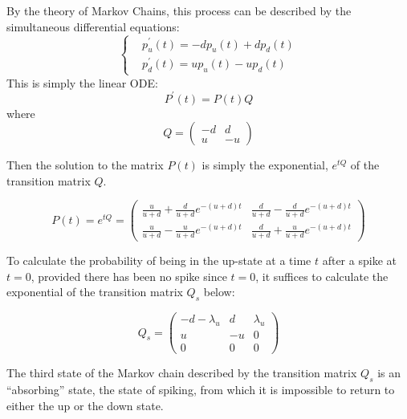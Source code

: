 By the theory of Markov Chains, this process can be described by the simultaneous differential equations:
\begin{equation}
\left\{
\begin{split} &p_u^{\prime}(t) = -dp_u(t) + dp_d(t)\\ &p_d^{\prime}(t)=up_u(t) - up_d(t)
\end{split}
\right.
\end{equation}
This is simply the linear ODE:
\begin{equation}
P^{\prime}(t) = P(t)Q
\end{equation}
where
\begin{equation}
Q =  \begin{pmatrix} -d & d \\ u & -u \end{pmatrix}
\end{equation}

Then the solution to the matrix $P(t)$ is simply the exponential, $e^{tQ}$ of the transition matrix $Q$. 

\begin{equation}
P(t) = e^{tQ} = \begin{pmatrix} \frac{u}{u+d}+\frac{d}{u+d}e^{-(u+d)t} & \frac{d}{u+d} - \frac{d}{u+d}e^{-(u+d)t} \\ \frac{u}{u+d} - \frac{u}{u+d}e^{-(u+d)t} & \frac{d}{u+d} + \frac{u}{u+d}e^{-(u+d)t}\end{pmatrix}
\end{equation}


To calculate the probability of being in the up-state at a time $t$ after a spike at $t=0$, provided there has been no spike since $t=0$, it suffices to calculate the exponential of the transition matrix $Q_s$ below:

\begin{equation}
Q_s = \begin{pmatrix} -d-\lambda_u & d & \lambda_u \\ u & -u & 0 \\ 0 & 0 & 0\end{pmatrix}
\end{equation}

The third state of the Markov chain described by the transition matrix $Q_s$ is an ``absorbing'' state, the state of spiking, from which it is impossible to return to either the up or the down state.

